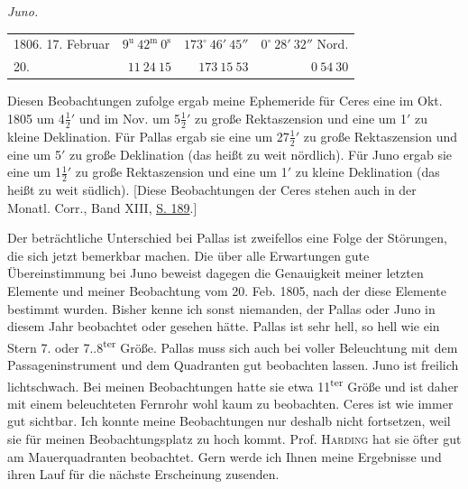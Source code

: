\begin{center}\emph{Juno.}\end{center}
\begin{center}
\begingroup\fontsize{9}{11}\selectfont\setlength{\tabcolsep}{2pt}\renewcommand{\arraystretch}{1.1}
\begin{tabular}{lr|r|r}
1806. 17. Februar & $9^{\mathrm u}\ 42^{\mathrm m}\ 0^{\mathrm s}$ & $173^\circ\ 46'\ 45''$ & $0^\circ\ 28'\ 32''$ Nord.\\
20. & $11\ 24\ 15$ & $173\ 15\ 53$ & $0\ 54\ 30$\\
\end{tabular}\endgroup
\end{center}

\par\indent Diesen Beobachtungen zufolge ergab meine Ephemeride für Ceres eine im Okt. 1805 um 4$\frac{1}{2}'$ und im Nov. um 5$\frac{1}{2}'$ zu große Rektaszension und eine um 1$'$ zu kleine Deklination. Für Pallas ergab sie eine um 27$\frac{1}{2}'$ zu große Rektaszension und eine um 5$'$ zu große Deklination (das heißt zu weit nördlich). Für Juno ergab sie eine um 1$\frac{1}{2}'$ zu große Rektaszension und eine um 1$'$ zu kleine Deklination (das heißt zu weit südlich). [Diese Beobachtungen der Ceres stehen auch in der Monatl. Corr., Band XIII, \href{https://www.digitale-sammlungen.de/en/view/bsb10538605?page=197}{S. 189}.]



\par\indent Der beträchtliche Unterschied bei Pallas ist zweifellos eine Folge der Störungen, die sich jetzt bemerkbar machen. Die über alle Erwartungen gute Übereinstimmung bei Juno beweist dagegen die Genauigkeit meiner letzten Elemente und meiner Beobachtung vom 20. Feb. 1805, nach der diese Elemente bestimmt wurden. Bisher kenne ich sonst niemanden, der Pallas oder Juno in diesem Jahr beobachtet oder gesehen hätte. Pallas ist sehr hell, so hell wie ein Stern 7. oder 7..8\textsuperscript{ter} Größe. Pallas muss sich auch bei voller Beleuchtung mit dem Passageninstrument und dem Quadranten gut beobachten lassen. Juno ist freilich lichtschwach. Bei meinen Beobachtungen hatte sie etwa 11\textsuperscript{ter} Größe und ist daher mit einem beleuchteten Fernrohr wohl kaum zu beobachten. Ceres ist wie immer gut sichtbar. Ich konnte meine Beobachtungen nur deshalb nicht fortsetzen, weil sie für meinen Beobachtungsplatz zu hoch kommt. Prof. \textsc{Harding} hat sie öfter gut am Mauerquadranten beobachtet. Gern werde ich Ihnen meine Ergebnisse und ihren Lauf für die nächste Erscheinung zusenden.

